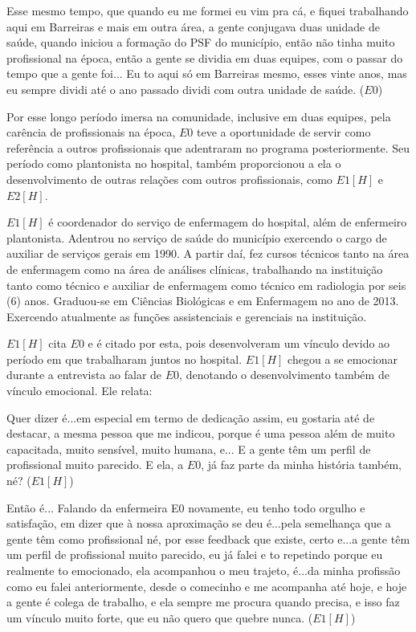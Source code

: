 \begin{citacao}
Esse mesmo tempo, que quando eu me formei eu vim pra cá, e fiquei trabalhando aqui em Barreiras e mais em outra área, a gente conjugava duas unidade de saúde, quando iniciou a formação do PSF do município, então não tinha muito profissional na época, então a gente se dividia em duas equipes, com o passar do tempo que a gente foi... Eu to aqui só em Barreiras mesmo, esses vinte anos, mas eu sempre dividi até o ano passado dividi com outra unidade de saúde. ($E0$)
\end{citacao}

Por esse longo período imersa na comunidade, inclusive em duas equipes, pela carência de profissionais na época, $E0$ teve a oportunidade de servir como referência a outros profissionais que adentraram no programa posteriormente. Seu período como plantonista no hospital, também proporcionou a ela o desenvolvimento de outras relações com outros profissionais, como $E1 [H]$ e $E2 [H]$.

$E1[H]$ é coordenador do serviço de enfermagem do hospital, além de enfermeiro plantonista. Adentrou no serviço de saúde do município exercendo o cargo de auxiliar de serviços gerais em 1990. A partir daí, fez cursos técnicos tanto na área de enfermagem como na área de análises clínicas, trabalhando na instituição tanto como técnico e auxiliar de enfermagem como técnico em radiologia por seis (6) anos. Graduou-se em Ciências Biológicas e em Enfermagem no ano de 2013. Exercendo atualmente as funções assistenciais e gerenciais na instituição.

$E1[H]$ cita $E0$ e é citado por esta, pois desenvolveram um vínculo devido ao período em que trabalharam juntos no hospital. $E1[H]$ chegou a se emocionar durante a entrevista ao falar de $E0$, denotando o desenvolvimento também de vínculo emocional. Ele relata:

\begin{citacao}
Quer dizer é...em especial em termo de dedicação assim, eu gostaria até de destacar, a mesma pessoa que me indicou, porque é uma pessoa além de muito capacitada, muito sensível, muito humana, e... E a gente têm um perfil de profissional muito parecido. E ela, a $E0$, já faz parte da minha história também, né? ($E1[H]$)

Então é... Falando da enfermeira E0 novamente, eu tenho todo orgulho e satisfação, em dizer que à nossa aproximação se deu é...pela semelhança que a gente têm como profissional né, por esse feedback que existe, certo e...a gente têm um perfil de profissional muito parecido, eu já falei e to repetindo porque eu realmente to emocionado, ela acompanhou o meu trajeto, é...da minha profissão como eu falei anteriormente, desde o comecinho e me acompanha até hoje, e hoje a gente é colega de trabalho, e ela sempre me procura quando precisa, e isso faz um vínculo muito forte, que eu não quero que quebre nunca. ($E1[H]$)
\end{citacao}

